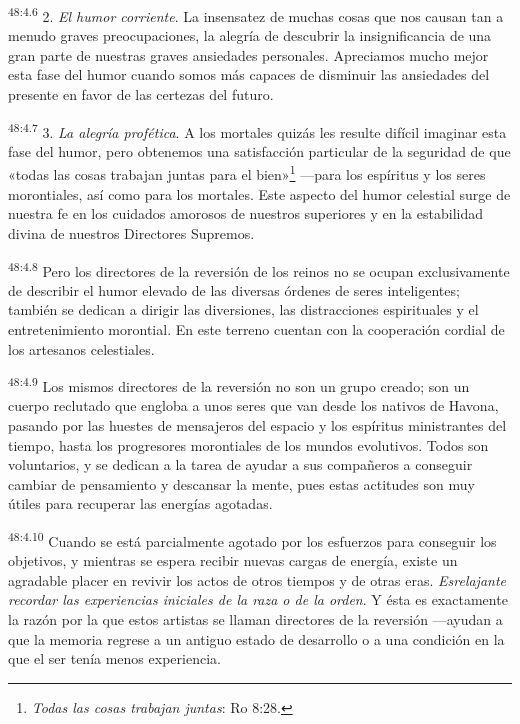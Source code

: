 \par
\textsuperscript{48:4.6} 2. \textit{El humor corriente}. La insensatez de muchas cosas que nos causan tan a menudo graves preocupaciones, la alegría de descubrir la insignificancia de una gran parte de nuestras graves ansiedades personales. Apreciamos mucho mejor esta fase del humor cuando somos más capaces de disminuir las ansiedades del presente en favor de las certezas del futuro.

\par
\textsuperscript{48:4.7} 3. \textit{La alegría profética}. A los mortales quizás les resulte difícil imaginar esta fase del humor, pero obtenemos una satisfacción particular de la seguridad de que «todas las cosas trabajan juntas para el bien»\footnote{\textit{Todas las cosas trabajan juntas}: Ro 8:28.} ---para los espíritus y los seres morontiales, así como para los mortales. Este aspecto del humor celestial surge de nuestra fe en los cuidados amorosos de nuestros superiores y en la estabilidad divina de nuestros Directores Supremos.

\par
\textsuperscript{48:4.8} Pero los directores de la reversión de los reinos no se ocupan exclusivamente de describir el humor elevado de las diversas órdenes de seres inteligentes; también se dedican a dirigir las diversiones, las distracciones espirituales y el entretenimiento morontial. En este terreno cuentan con la cooperación cordial de los artesanos celestiales.

\par
\textsuperscript{48:4.9} Los mismos directores de la reversión no son un grupo creado; son un cuerpo reclutado que engloba a unos seres que van desde los nativos de Havona, pasando por las huestes de mensajeros del espacio y los espíritus ministrantes del tiempo, hasta los progresores morontiales de los mundos evolutivos. Todos son voluntarios, y se dedican a la tarea de ayudar a sus compañeros a conseguir cambiar de pensamiento y descansar la mente, pues estas actitudes son muy útiles para recuperar las energías agotadas.

\par
\textsuperscript{48:4.10} Cuando se está parcialmente agotado por los esfuerzos para conseguir los objetivos, y mientras se espera recibir nuevas cargas de energía, existe un agradable placer en revivir los actos de otros tiempos y de otras eras. \textit{Esrelajante recordar las experiencias iniciales de la raza o de la orden}. Y ésta es exactamente la razón por la que estos artistas se llaman directores de la reversión ---ayudan a que la memoria regrese a un antiguo estado de desarrollo o a una condición en la que el ser tenía menos experiencia.

